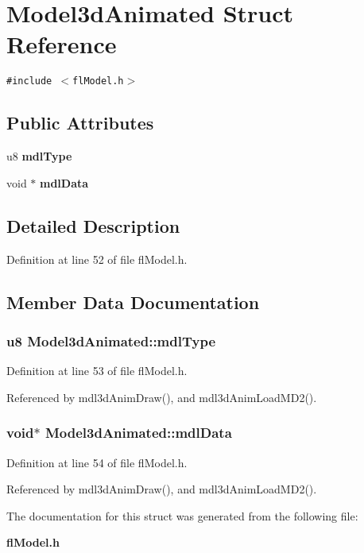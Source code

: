 \section{Model3d\-Animated Struct Reference}
\label{structModel3dAnimated}
{\tt \#include $<$fl\-Model.h$>$}

\subsection*{Public Attributes}
\begin{CompactItemize}
\item 
u8 {\bf mdl\-Type}
\item 
void $\ast$ {\bf mdl\-Data}
\end{CompactItemize}


\subsection{Detailed Description}




Definition at line 52 of file fl\-Model.h.

\subsection{Member Data Documentation}
\subsubsection{\setlength{\rightskip}{0pt plus 5cm}u8 {\bf Model3d\-Animated::mdl\-Type}}\label{structModel3dAnimated_cd53e519d9b998deef1cfae4b7efbf16}




Definition at line 53 of file fl\-Model.h.

Referenced by mdl3d\-Anim\-Draw(), and mdl3d\-Anim\-Load\-MD2().
\subsubsection{\setlength{\rightskip}{0pt plus 5cm}void$\ast$ {\bf Model3d\-Animated::mdl\-Data}}\label{structModel3dAnimated_2e681d796bb8a1e4cf48c6d7e038a5df}




Definition at line 54 of file fl\-Model.h.

Referenced by mdl3d\-Anim\-Draw(), and mdl3d\-Anim\-Load\-MD2().

The documentation for this struct was generated from the following file:\begin{CompactItemize}
\item 
{\bf fl\-Model.h}\end{CompactItemize}
